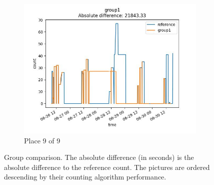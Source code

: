 \begin{figure}
    \begin{subfigure}[b]{0.45\textwidth}
        \includegraphics[width=\linewidth]{figures/ref-group1.jpeg}
        \caption{Place 9 of 9}
    \end{subfigure}
    \caption{Group comparison. The absolute difference (in seconds) is the absolute difference to the reference count.
        The pictures are ordered descending by their counting algorithm performance.}
    \label{fig_comparison2}
\end{figure}